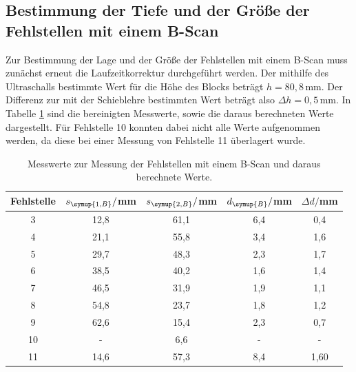 \subsection{Bestimmung der Tiefe und der Größe der Fehlstellen mit einem B-Scan}
\label{subsec:B_scan_Fehlstellen}

Zur Bestimmung der Lage und der Größe der Fehlstellen mit einem B-Scan muss zunächst
erneut die Laufzeitkorrektur durchgeführt werden. Der mithilfe des Ultraschalls bestimmte
Wert für die Höhe des Blocks beträgt $h=80{,}8\,$mm. Der Differenz zur mit der Schieblehre
bestimmten Wert beträgt also $\Delta h=0{,}5\,$mm. In Tabelle \ref{tab:b-scan}
sind die bereinigten Messwerte, sowie die daraus berechneten Werte dargestellt.
Für Fehlstelle 10 konnten dabei nicht alle Werte aufgenommen werden, da diese bei einer
Messung von Fehlstelle 11 überlagert wurde.

\begin{table}[htp]
	\begin{center}
    \caption{Messwerte zur Messung der Fehlstellen mit einem B-Scan und daraus berechnete Werte.}
    \label{tab:b-scan}
		\begin{tabular}{ccccc}
		\toprule
			{Fehlstelle} & {$s_{\symup{1,B}}/$mm} & {$s_{\symup{2,B}}/$mm} & {$d_{\symup{B}}/$mm} & {$\Delta d/$mm}\\
			\midrule
			3 & 12,8 & 61,1 & 6,4 & 0,4\\
			4 & 21,1 & 55,8 & 3,4 & 1,6\\
			5 & 29,7 & 48,3 & 2,3 & 1,7\\
			6 & 38,5 & 40,2 & 1,6 & 1,4\\
			7 & 46,5 & 31,9 & 1,9 & 1,1\\
			8 & 54,8 & 23,7 & 1,8 & 1,2\\
			9 & 62,6 & 15,4 & 2,3 & 0,7\\
			10 & {-} & 6,6 & {-} & {-}\\
			11 & 14,6 & 57,3 & 8,4 & 1,60\\
		\bottomrule
		\end{tabular}
	\end{center}
\end{table}

